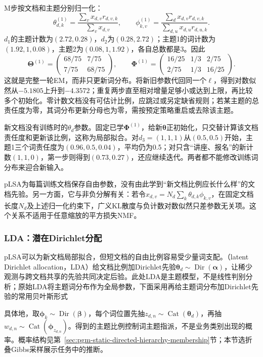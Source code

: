 M步按文档和主题分别归一化：
\[
 \theta_{d,k}^{(1)}=\frac{\sum_vx_{d,v}r_{d,v,k}}{\sum_vx_{d,v}},
 \qquad
 \phi_{k,v}^{(1)}=\frac{\sum_dx_{d,v}r_{d,v,k}}
                      {\sum_{d,u}x_{d,u}r_{d,u,k}}.
\]
$d_1$的主题计数为$(2.72,0.28)$，$d_2$为$(0.28,2.72)$；主题1的词计数为$(1.92,1,0.08)$，主题2为$(0.08,1,1.92)$，各自总数都是3。因此
\[
 \bm\Theta^{(1)}=
 \begin{pmatrix}68/75&7/75\\7/75&68/75\end{pmatrix},\qquad
 \bm\Phi^{(1)}=
 \begin{pmatrix}16/25&1/3&2/75\\2/75&1/3&16/25\end{pmatrix}.
\]
这就是完整一轮EM，而非只更新词分布。将新旧参数代回同一个$\ell$，得到对数似然从$-5.1805$上升到$-4.3572$；重复两步直至相对增量足够小或达到上限，再比较多个初始化。零计数文档没有可估计比例，应跳过或另定缺省规则；若某主题的总责任度为零，其词分布更新分母也为零，需按预定策略重启或去除该主题。

新文档没有训练时的$\theta_d$参数。固定已学$\bm\Phi^{(1)}$，给新$\bm\theta$正初始化，只交替计算该文档责任度和更新该比例，这称为局部拟合。对$d_3=(1,1,1)$从$(0.5,0.5)$开始，主题1三个词责任度为$(0.96,0.5,0.04)$，平均仍为0.5；对只含“讲座、报名”的新计数$(1,1,0)$，第一步则得到$(0.73,0.27)$，还应继续迭代。两者都不能修改训练词分布来迎合新输入。

pLSA为每篇训练文档保存自由参数，没有由此学到“新文档比例应长什么样”的文档先验。另一方面，它与非负分解有关：若令$\widehat x_{d,v}=N_d\sum_k\theta_{d,k}\phi_{k,v}$，在固定文档长度$N_d$及上述归一化约束下，广义KL散度与负计数对数似然只差参数无关项。这个关系不适用于任意缩放的平方损失NMF。

\subsubsection{LDA：潜在Dirichlet分配}
\label{sec:nlp-classification-lda}

pLSA可以为新文档局部拟合，但短文档的自由比例容易受少量词支配。（latent Dirichlet allocation，LDA）给文档比例加Dirichlet先验$\bm\theta_d\sim\operatorname{Dir}(\bm\alpha)$，让稀少观测与跨文档共享的先验共同决定后验。此处LDA是主题模型，不是线性判别分析；原始LDA将主题词分布作为全局参数，下面采用再给主题词分布加Dirichlet先验的常用贝叶斯形式

具体地，取$\bm\phi_k\sim\operatorname{Dir}(\bm\beta)$，每个词位置先抽$z_{d,n}\sim\operatorname{Cat}(\bm\theta_d)$，再抽$w_{d,n}\sim\operatorname{Cat}(\bm\phi_{z_{d,n}})$。得到的主题比例控制词主题指派，不是业务类别出现的概率。概率结构见第~\ref{sec:pgm-static-directed-hierarchy-membership}节；本节选折叠Gibbs采样展示任务中的推断。

